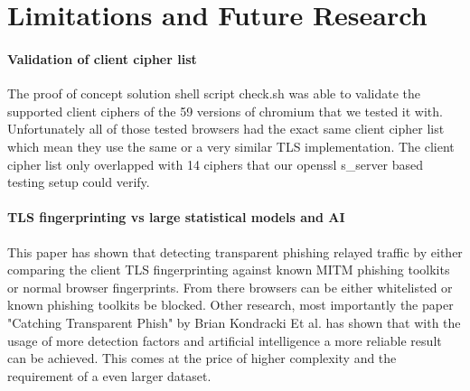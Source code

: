 \documentclass[12pt]{scrbook}
\begin{document}
\section{Limitations and Future Research}

\paragraph{Validation of client cipher list}
The proof of concept solution shell script check.sh was able to validate the
supported client ciphers of the 59 versions of chromium that we tested it with.
Unfortunately all of those tested browsers had the exact same client cipher list
which mean they use the same or a very similar TLS implementation. The client cipher list only
overlapped with 14 ciphers that our openssl s\_server based testing setup could
verify.

\paragraph{TLS fingerprinting vs large statistical models and AI}
This paper has shown that detecting transparent phishing relayed traffic by either
comparing the client TLS fingerprinting against known MITM phishing toolkits or normal browser fingerprints.
From there browsers can be either whitelisted or known phishing toolkits be blocked.
Other research, most importantly the paper "Catching Transparent Phish" by Brian Kondracki Et al. has shown
that with the usage of more detection factors and artificial intelligence a more reliable result can be achieved.
This comes at the price of higher complexity and the requirement of a even larger dataset.


\newpage  
\end{document}
